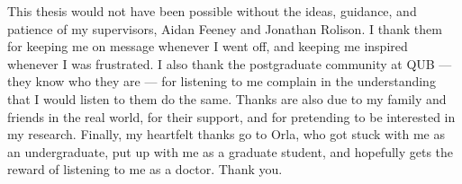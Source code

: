 

This thesis would not have been possible
without the ideas, guidance, and patience
of my supervisors, Aidan Feeney and Jonathan Rolison.
I thank them for keeping me on message whenever I went off,
and keeping me inspired whenever I was frustrated.
I also thank the postgraduate community at QUB
--- they know who they are ---
for listening to me complain
in the understanding that
I would listen to them do the same.
Thanks are also due to my family and friends in the real world,
for their support, and for pretending to be interested in my research.
Finally, my heartfelt thanks go to Orla,
who got stuck with me as an undergraduate,
put up with me as a graduate student,
and hopefully gets the reward of listening to me as a doctor. Thank you.
